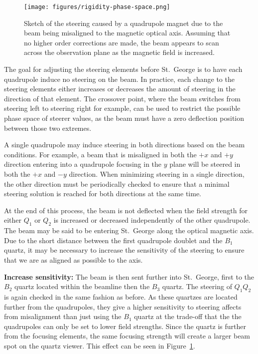 \begin{figure}[t]
    \begin{center}
        \centerline{\texttt{[image: figures/rigidity-phase-space.png]}}
        \caption[Sketch of quadrupole steering of misaligned beam]{Sketch
        of the steering caused by a quadrupole magnet due to the beam
        being misaligned to the magnetic optical axis. Assuming that no
        higher order corrections are made, the beam appears to scan
        across the observation plane as the magnetic field is
        increased.}
        \label{fig:steering}
    \end{center}
\end{figure}

The goal for adjusting the steering elements before St.\ George is to
have each quadrupole induce no steering on the beam. In practice, each
change to the steering elements either increases or decreases the amount
of steering in the direction of that element. The crossover point, where
the beam switches from steering left to steering right for example, can
be used to restrict the possible phase space of steerer values, as the
beam must have a zero deflection position between those two extremes.

A single quadrupole may induce steering in both directions based on the
beam conditions. For example, a beam that is misaligned in both the $+x$
and $+y$ direction entering into a quadrupole focusing in the $y$ plane
will be steered in both the $+x$ and $-y$ direction. When minimizing
steering in a single direction, the other direction must be periodically
checked to ensure that a minimal steering solution is reached for both
directions at the same time.

At the end of this process, the beam is not deflected when the field
strength for either $Q_1$ or $Q_2$ is increased or decreased
independently of the other quadrupole. The beam may be said to be
entering St.\ George along the optical magnetic axis. Due to the short
distance between the first quadrupole doublet and the $B_1$ quartz, it
may be necessary to increase the sensitivity of the steering to ensure
that we are as aligned as possible to the axis.

\textbf{Increase sensitivity:}
The beam is then sent further into St.\ George, first to the $B_2$
quartz located within the beamline then the $B_3$ quartz. The steering
of $Q_1Q_2$ is again checked in the same fashion as before. As these
quartzes are located further from the quadrupoles, they give a higher
sensitivity to steering affects from misalignment than just using the
$B_1$ quartz at the trade-off that the the quadrupoles can only be set
to lower field strengths. Since the quartz is further from the focusing
elements, the same focusing strength will create a larger beam spot on
the quartz viewer. This effect can be seen in Figure~\ref{fig:steering}.

